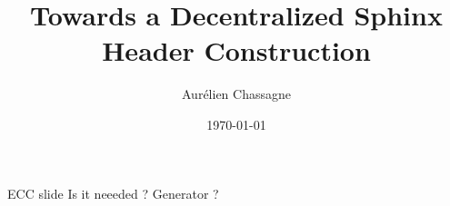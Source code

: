 \documentclass[aspectratio=1610]{beamer}
\title{Towards a Decentralized Sphinx Header Construction}
\author{Aurélien Chassagne}
\date{\today}
\begin{document}
\begin{frame}
\titlepage
\end{frame}









\begin{frame}{\color{red} ECC slide}
    {\color{red} Is it neeeded ? Generator ?}
\end{frame}



\end{document}
